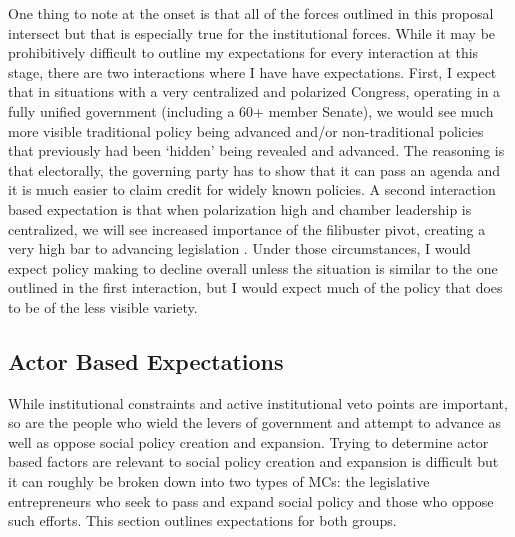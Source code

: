 \documentclass[12pt]{article}
\begin{document}
One thing to note at the onset is that all of the forces outlined in this proposal intersect but that is especially true for the institutional forces. While it may be prohibitively difficult to outline my expectations for every interaction at this stage, there are two interactions where I have have expectations. First, I expect that in situations with a very centralized and polarized Congress, operating in a fully unified government (including a 60+ member Senate), we would see much more visible traditional policy being advanced and/or non-traditional policies that previously had been `hidden' being revealed and advanced. The reasoning is that electorally, the governing party has to show that it can pass an agenda and it is much easier to claim credit for widely known policies. A second interaction based expectation is that when polarization high and chamber leadership is centralized, we will see increased importance of the filibuster pivot, creating a very high bar to advancing legislation \citep{koger2010}. Under those circumstances, I would expect policy making to decline overall unless the situation is similar to the one outlined in the first interaction, but I would expect much of the policy that does to be of the less visible variety.


\subsection{Actor Based Expectations}
While institutional constraints and active institutional veto points are important, so are the people who wield the levers of government and attempt to advance as well as oppose social policy creation and expansion. Trying to determine actor based factors are relevant to social policy creation and expansion is difficult but it can roughly be broken down into two types of MCs: the legislative entrepreneurs who seek to pass and expand social policy and those who oppose such efforts. This section outlines expectations for both groups.
\end{document}

